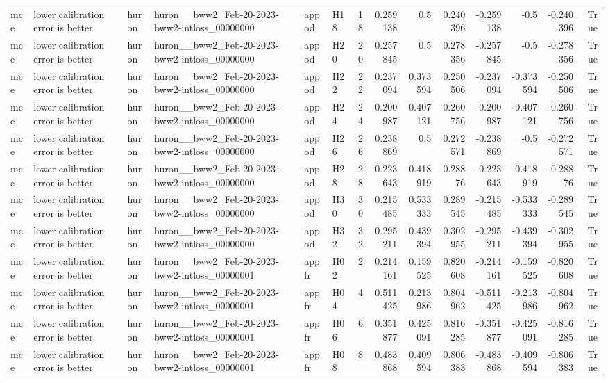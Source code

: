 \begin{longtable}{llllllrrrrrrrr}
mce & lower calibration error is better & huron & huron\_\_bww2\_Feb-20-2023-bww2-intloss\_00000000 & appod & H18 & 18 & 0.259138 & 0.5 & 0.240396 & -0.259138 & -0.5 & -0.240396 & True \\
mce & lower calibration error is better & huron & huron\_\_bww2\_Feb-20-2023-bww2-intloss\_00000000 & appod & H20 & 20 & 0.257845 & 0.5 & 0.278356 & -0.257845 & -0.5 & -0.278356 & True \\
mce & lower calibration error is better & huron & huron\_\_bww2\_Feb-20-2023-bww2-intloss\_00000000 & appod & H22 & 22 & 0.237094 & 0.373594 & 0.250506 & -0.237094 & -0.373594 & -0.250506 & True \\
mce & lower calibration error is better & huron & huron\_\_bww2\_Feb-20-2023-bww2-intloss\_00000000 & appod & H24 & 24 & 0.200987 & 0.407121 & 0.260756 & -0.200987 & -0.407121 & -0.260756 & True \\
mce & lower calibration error is better & huron & huron\_\_bww2\_Feb-20-2023-bww2-intloss\_00000000 & appod & H26 & 26 & 0.238869 & 0.5 & 0.272571 & -0.238869 & -0.5 & -0.272571 & True \\
mce & lower calibration error is better & huron & huron\_\_bww2\_Feb-20-2023-bww2-intloss\_00000000 & appod & H28 & 28 & 0.223643 & 0.418919 & 0.28876 & -0.223643 & -0.418919 & -0.28876 & True \\
mce & lower calibration error is better & huron & huron\_\_bww2\_Feb-20-2023-bww2-intloss\_00000000 & appod & H30 & 30 & 0.215485 & 0.533333 & 0.289545 & -0.215485 & -0.533333 & -0.289545 & True \\
mce & lower calibration error is better & huron & huron\_\_bww2\_Feb-20-2023-bww2-intloss\_00000000 & appod & H32 & 32 & 0.295211 & 0.439394 & 0.302955 & -0.295211 & -0.439394 & -0.302955 & True \\
mce & lower calibration error is better & huron & huron\_\_bww2\_Feb-20-2023-bww2-intloss\_00000001 & appfr & H02 & 2 & 0.214161 & 0.159525 & 0.820608 & -0.214161 & -0.159525 & -0.820608 & True \\
mce & lower calibration error is better & huron & huron\_\_bww2\_Feb-20-2023-bww2-intloss\_00000001 & appfr & H04 & 4 & 0.511425 & 0.213986 & 0.804962 & -0.511425 & -0.213986 & -0.804962 & True \\
mce & lower calibration error is better & huron & huron\_\_bww2\_Feb-20-2023-bww2-intloss\_00000001 & appfr & H06 & 6 & 0.351877 & 0.425091 & 0.816285 & -0.351877 & -0.425091 & -0.816285 & True \\
mce & lower calibration error is better & huron & huron\_\_bww2\_Feb-20-2023-bww2-intloss\_00000001 & appfr & H08 & 8 & 0.483868 & 0.409594 & 0.806383 & -0.483868 & -0.409594 & -0.806383 & True \\

\end{longtable}
